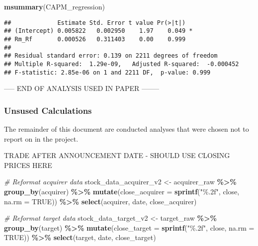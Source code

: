 \documentclass[
]{article}
\newenvironment{Shaded}{\begin{snugshade}}{\end{snugshade}}
\newcommand{\CommentTok}[1]{\textcolor[rgb]{0.56,0.35,0.01}{\textit{#1}}}
\newcommand{\DataTypeTok}[1]{\textcolor[rgb]{0.13,0.29,0.53}{#1}}
\newcommand{\KeywordTok}[1]{\textcolor[rgb]{0.13,0.29,0.53}{\textbf{#1}}}
\newcommand{\NormalTok}[1]{#1}
\newcommand{\OperatorTok}[1]{\textcolor[rgb]{0.81,0.36,0.00}{\textbf{#1}}}
\newcommand{\OtherTok}[1]{\textcolor[rgb]{0.56,0.35,0.01}{#1}}
\newcommand{\StringTok}[1]{\textcolor[rgb]{0.31,0.60,0.02}{#1}}
\begin{document}
\begin{Shaded}
\begin{Highlighting}[]
\KeywordTok{msummary}\NormalTok{(CAPM\_regression)}
\end{Highlighting}
\end{Shaded}

\begin{verbatim}
##             Estimate Std. Error t value Pr(>|t|)  
## (Intercept) 0.005822   0.002950    1.97    0.049 *
## Rm_Rf       0.000526   0.311403    0.00    0.999  
## 
## Residual standard error: 0.139 on 2211 degrees of freedom
## Multiple R-squared:  1.29e-09,   Adjusted R-squared:  -0.000452 
## F-statistic: 2.85e-06 on 1 and 2211 DF,  p-value: 0.999
\end{verbatim}

----- END OF ANALYSIS USED IN PAPER --------

\hypertarget{unsused-calculations}{%
\subsubsection{Unsused Calculations}\label{unsused-calculations}}

The remainder of this document are conducted analyses that were chosen
not to report on in the project.

TRADE AFTER ANNOUNCEMENT DATE - SHOULD USE CLOSING PRICES HERE

\begin{Shaded}
\begin{Highlighting}[]
\CommentTok{\# Reformat acquirer data}
\NormalTok{stock\_data\_acquirer\_v2 \textless{}{-}}\StringTok{ }\NormalTok{acquirer\_raw }\OperatorTok{\%\textgreater{}\%}
\StringTok{  }\KeywordTok{group\_by}\NormalTok{(acquirer) }\OperatorTok{\%\textgreater{}\%}\StringTok{ }
\StringTok{  }\KeywordTok{mutate}\NormalTok{(}\DataTypeTok{close\_acquirer =} \KeywordTok{sprintf}\NormalTok{(}\StringTok{"\%.2f"}\NormalTok{, close, }\DataTypeTok{na.rm =} \OtherTok{TRUE}\NormalTok{)) }\OperatorTok{\%\textgreater{}\%}
\StringTok{  }\KeywordTok{select}\NormalTok{(acquirer, date, close\_acquirer)}
\end{Highlighting}
\end{Shaded}

\begin{Shaded}
\begin{Highlighting}[]
\CommentTok{\# Reformat target data}
\NormalTok{stock\_data\_target\_v2 \textless{}{-}}\StringTok{ }\NormalTok{target\_raw }\OperatorTok{\%\textgreater{}\%}
\StringTok{  }\KeywordTok{group\_by}\NormalTok{(target) }\OperatorTok{\%\textgreater{}\%}\StringTok{ }
\StringTok{  }\KeywordTok{mutate}\NormalTok{(}\DataTypeTok{close\_target =} \KeywordTok{sprintf}\NormalTok{(}\StringTok{"\%.2f"}\NormalTok{, close, }\DataTypeTok{na.rm =} \OtherTok{TRUE}\NormalTok{)) }\OperatorTok{\%\textgreater{}\%}
\StringTok{  }\KeywordTok{select}\NormalTok{(target, date, close\_target)}
\end{Highlighting}
\end{Shaded}
\end{document}
